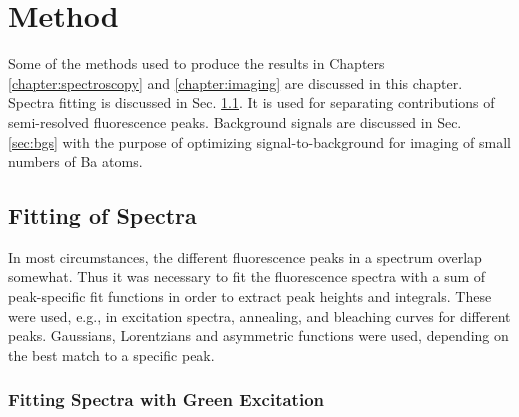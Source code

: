 \chapter{Method}

Some of the methods used to produce the results in Chapters \ref{chapter:spectroscopy} and \ref{chapter:imaging} are discussed in this chapter.  Spectra fitting is discussed in Sec. \ref{sec:fitting}.  It is used for separating contributions of semi-resolved fluorescence peaks.  Background signals are discussed in Sec. \ref{sec:bgs} with the purpose of optimizing signal-to-background for imaging of small numbers of Ba atoms.

\section{Fitting of Spectra}
\label{sec:fitting}

In most circumstances, the different fluorescence peaks in a spectrum overlap somewhat.  Thus it was necessary to fit the fluorescence spectra with a sum of peak-specific fit functions in order to extract peak heights and integrals.  These were used, e.g., in excitation spectra, annealing, and bleaching curves for different peaks.  Gaussians, Lorentzians and asymmetric functions were used, depending on the best match to a specific peak.


\subsection{Fitting Spectra with Green Excitation}
\label{subsec:fitgrn}

